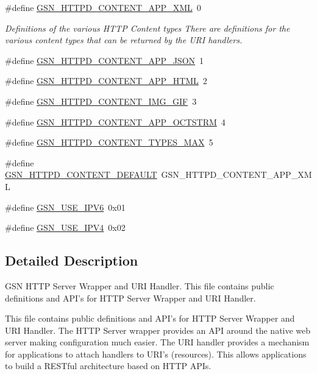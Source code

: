 \begin{DoxyCompactItemize}
\item 
\#define \hyperlink{a00666_ga3004294919c3368623df769bbbc8e843}{GSN\_\-HTTPD\_\-CONTENT\_\-APP\_\-XML}~0
\begin{DoxyCompactList}\small\item\em Definitions of the various HTTP Content types There are definitions for the various content types that can be returned by the URI handlers. \end{DoxyCompactList}\item 
\#define \hyperlink{a00666_gadb38ca97283506dc6dc4fd43956d3f1b}{GSN\_\-HTTPD\_\-CONTENT\_\-APP\_\-JSON}~1
\item 
\#define \hyperlink{a00666_ga19c52b08a8222ee99b7bbfb85ce76435}{GSN\_\-HTTPD\_\-CONTENT\_\-APP\_\-HTML}~2
\item 
\#define \hyperlink{a00666_gac415fd2b4698131654ed19395cc07941}{GSN\_\-HTTPD\_\-CONTENT\_\-IMG\_\-GIF}~3
\item 
\#define \hyperlink{a00666_ga609fa91a2102bbc3f21d0fb9c2f492a9}{GSN\_\-HTTPD\_\-CONTENT\_\-APP\_\-OCTSTRM}~4
\item 
\#define \hyperlink{a00666_ga401387dbe1a0b570c26f495cbd92e53a}{GSN\_\-HTTPD\_\-CONTENT\_\-TYPES\_\-MAX}~5
\item 
\#define \hyperlink{a00666_gafd71fee266007e7dd46c2453ed351e18}{GSN\_\-HTTPD\_\-CONTENT\_\-DEFAULT}~GSN\_\-HTTPD\_\-CONTENT\_\-APP\_\-XML
\item 
\#define \hyperlink{a00666_ga96878e559c11f82897b9a300d88d376c}{GSN\_\-USE\_\-IPV6}~0x01
\item 
\#define \hyperlink{a00666_ga1de955d22e5f48865ad9e80c3bdcf945}{GSN\_\-USE\_\-IPV4}~0x02
\end{DoxyCompactItemize}


\subsection{Detailed Description}
GSN HTTP Server Wrapper and URI Handler. This file contains public definitions and API's for HTTP Server Wrapper and URI Handler. \par


\par
 This file contains public definitions and API's for HTTP Server Wrapper and URI Handler. The HTTP Server wrapper provides an API around the native web server making configuration much easier. The URI handler provides a mechanism for applications to attach handlers to URI's (resources). This allows applications to build a RESTful architecture based on HTTP APIs. 

